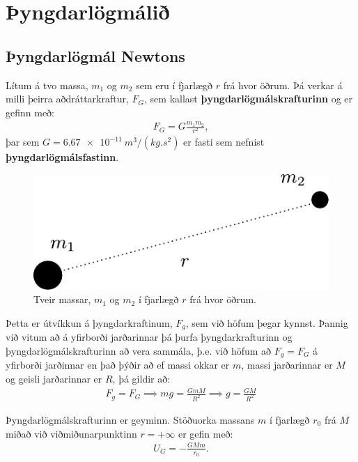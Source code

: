 \ifdefined \wholebook \else\documentclass[oneside]{book}\usepackage{EdlBook}\graphicspath{{figures/}}
\begin{document}
%
\setcounter{chapter}{7} %
%
\fi

\renewcommand{\thefigure}{\arabic{figure}}


\chapter{Þyngdarlögmálið}

\section{Þyngdarlögmál Newtons}

\begin{tcolorbox}
\begin{definition}
Lítum á tvo massa, $m_1$ og $m_2$ sem eru í fjarlægð $r$ frá hvor öðrum. Þá verkar á milli þeirra aðdráttarkraftur, $F_G$, sem kallast \textbf{þyngdarlögmálskrafturinn} og er gefinn með:
\begin{align*}
    F_G = G \frac{m_1 m_2}{r^2},
\end{align*}
þar sem $G = \SI{6.67e-11}{m^3/(kg.s^2)}$ er fasti sem nefnist \textbf{þyngdarlögmálsfastinn}.
\end{definition}
\end{tcolorbox}

\begin{figure}[H]
    \centering
    \includegraphics[scale = 0.75]{figures/fG.pdf}
    \caption{Tveir massar, $m_1$ og $m_2$ í fjarlægð $r$ frá hvor öðrum.}
\end{figure}


Þetta er útvíkkun á þyngdarkraftinum, $F_g$, sem við höfum þegar kynnst. Þannig við vitum að á yfirborði jarðarinnar þá þurfa þyngdarkrafturinn og þyngdarlögmálskrafturinn að vera sammála, þ.e. við höfum að $F_g = F_G$ á yfirborði jarðinnar en það þýðir að ef massi okkar er $m$, massi jarðarinnar er $M$ og geisli jarðarinnar er $R$, þá gildir að:
\begin{align*}
    F_g = F_G \implies mg = \frac{GmM}{R^2} \implies g = \frac{GM}{R^2}
\end{align*}
\begin{tcolorbox}
\begin{theorem}
Þyngdarlögmálskrafturinn er geyminn. Stöðuorka massans $m$ í fjarlægð $r_0$ frá $M$ miðað við viðmiðunarpunktinn $r = +\infty$ er gefin með:
\begin{align*}
    U_G = -\frac{GM m}{r_0}.
\end{align*}
\end{theorem}
\end{tcolorbox}
\end{document}
